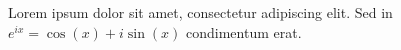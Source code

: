 \documentclass{article}
\begin{document}
Lorem ipsum dolor sit amet, consectetur adipiscing elit. Sed in \({e^{ix} = \cos(x) + i \sin(x)}\) condimentum erat.
\end{document}
